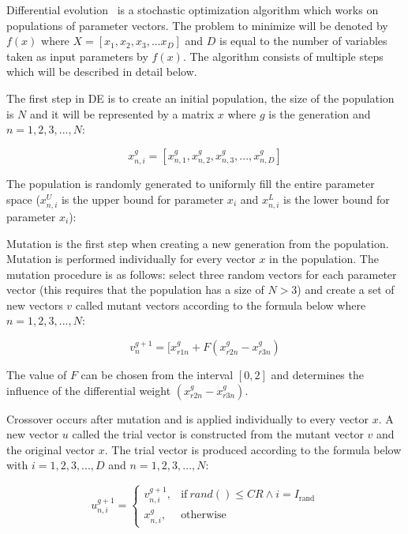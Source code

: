 Differential evolution~\cite{Storn1997} is a stochastic optimization algorithm which works on populations of parameter vectors. The problem to minimize will be denoted by $f(x)$ where $X=[x_1,x_2,x_3,...x_D]$ and $D$ is equal to the number of variables taken as input parameters by $f(x)$. The algorithm consists of multiple steps which will be described in detail below.

The first step in DE is to create an initial population, the size of the population is $N$ and it will be represented by a matrix $x$ where $g$ is the generation and $n=1,2,3,...,N$:

\begin{equation}
x_{n,i}^{g} = [ x_{n,1}^{g}, x_{n,2}^{g}, x_{n,3}^{g}, ..., x_{n,D}^{g} ]
\end{equation}

The population is randomly generated to uniformly fill the entire parameter space ($x_{n,i}^U$ is the upper bound for parameter $x_i$ and $x_{n,i}^L$ is the lower bound for parameter $x_i$):

Mutation is the first step when creating a new generation from the population. Mutation is performed individually for every vector $x$ in the population. The mutation procedure is as follows: select three random vectors for each parameter vector (this requires that the population has a size of $N > 3$) and create a set of new vectors $v$ called mutant vectors according to the formula below where $n=1,2,3,...,N$:

\begin{equation}
v_{n}^{g+1} = [ x_{r1n}^{g} + F(x_{r2n}^{g} - x_{r3n}^{g})
\end{equation}

The value of $F$ can be chosen from the interval $[0,2]$ and determines the influence of the differential weight $(x_{r2n}^{g} - x_{r3n}^{g})$.

Crossover occurs after mutation and is applied individually to every vector $x$. A new vector $u$ called the trial vector is constructed from the mutant vector $v$ and the original vector $x$. The trial vector is produced according to the formula below with $i=1,2,3,...,D$ and $n=1,2,3,...,N$:

\begin{equation}
    u_{n,i}^{g+1} =
    \begin{cases}
      v_{n,i}^{g+1}, & \text{if}\ rand() \leq CR \wedge i = I_{\text{rand}} \\
      x_{n,i}^{g}, & \text{otherwise}
\end{cases}
\end{equation}

